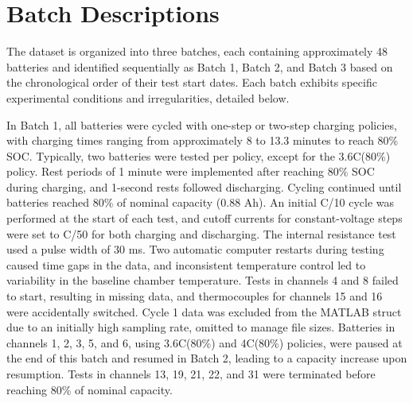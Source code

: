 \appendix
\section{Batch Descriptions} \label{sec:batch_desc}

The dataset is organized into three batches, each containing approximately 48 batteries and identified sequentially as Batch 1, Batch 2, and Batch 3 based on the chronological order of their test start dates. Each batch exhibits specific experimental conditions and irregularities, detailed below.

In Batch 1, all batteries were cycled with one-step or two-step charging policies, with charging times ranging from approximately 8 to 13.3 minutes to reach 80\% SOC. Typically, two batteries were tested per policy, except for the 3.6C(80\%) policy. Rest periods of 1 minute were implemented after reaching 80\% SOC during charging, and 1-second rests followed discharging. Cycling continued until batteries reached 80\% of nominal capacity (0.88 Ah). An initial C/10 cycle was performed at the start of each test, and cutoff currents for constant-voltage steps were set to C/50 for both charging and discharging. The internal resistance test used a pulse width of 30 ms. Two automatic computer restarts during testing caused time gaps in the data, and inconsistent temperature control led to variability in the baseline chamber temperature. Tests in channels 4 and 8 failed to start, resulting in missing data, and thermocouples for channels 15 and 16 were accidentally switched. Cycle 1 data was excluded from the MATLAB struct due to an initially high sampling rate, omitted to manage file sizes. Batteries in channels 1, 2, 3, 5, and 6, using 3.6C(80\%) and 4C(80\%) policies, were paused at the end of this batch and resumed in Batch 2, leading to a capacity increase upon resumption. Tests in channels 13, 19, 21, 22, and 31 were terminated before reaching 80\% of nominal capacity.

